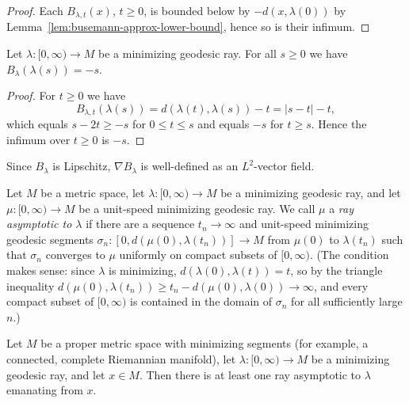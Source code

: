 \begin{proof}
\leanok
{}
Each $B_{\lambda,t}(x)$, $t\ge 0$, is bounded below by
$-d(x,\lambda(0))$ by Lemma~\ref{lem:busemann-approx-lower-bound},
hence so is their infimum.
\end{proof}

\begin{lemma}
\label{lem:busemann-along-ray}
\leanok
{}
Let $\lambda\colon [0,\infty)\to M$ be a minimizing geodesic ray.
For all $s\ge 0$ we have $B_\lambda(\lambda(s))=-s$.
\end{lemma}

\begin{proof}
\leanok
For $t\ge 0$ we have
$$B_{\lambda,t}(\lambda(s))=d(\lambda(t),\lambda(s))-t=|s-t|-t,$$
which equals $s-2t\ge -s$ for $0\le t\le s$ and equals $-s$ for
$t\ge s$. Hence the infimum over $t\ge 0$ is $-s$.
\end{proof}

Since $B_\lambda$ is Lipschitz, $\nabla B_\lambda$ is
well-defined as an $L^2$-vector field.

\begin{definition}
\label{def:asymptotic-ray}
\leanok
{}
Let $M$ be a metric space, let $\lambda\colon[0,\infty)\to M$ be a
minimizing geodesic ray, and let $\mu\colon[0,\infty)\to M$ be a
unit-speed minimizing geodesic ray. We call $\mu$ a {\em ray
asymptotic to $\lambda$} if there are a sequence
$t_n\rightarrow\infty$ and unit-speed minimizing geodesic segments
$\sigma_n\colon[0,d(\mu(0),\lambda(t_n))]\to M$ from $\mu(0)$ to
$\lambda(t_n)$ such that $\sigma_n$ converges to $\mu$ uniformly on
compact subsets of $[0,\infty)$. (The condition makes sense: since
$\lambda$ is minimizing, $d(\lambda(0),\lambda(t))=t$, so by the
triangle inequality
$d(\mu(0),\lambda(t_n))\ge t_n-d(\mu(0),\lambda(0))
\rightarrow\infty$, and every compact subset of $[0,\infty)$ is
contained in the domain of $\sigma_n$ for all sufficiently large
$n$.)
\end{definition}

\begin{lemma}
\label{lem:asymptotic-ray-exists}
\leanok
{}
Let $M$ be a proper metric space with minimizing segments (for
example, a connected, complete Riemannian manifold), let
$\lambda\colon[0,\infty)\to M$ be a minimizing geodesic ray, and
let $x\in M$. Then there is at least one ray asymptotic to
$\lambda$ emanating from $x$.
\end{lemma}

